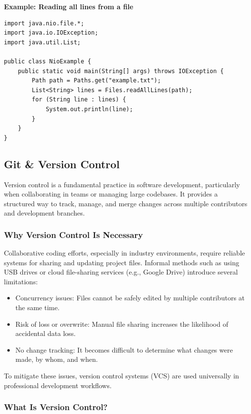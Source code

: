 \documentclass{article}
\begin{document}
\noindent\textbf{Example: Reading all lines from a file}
\begin{verbatim}
import java.nio.file.*;
import java.io.IOException;
import java.util.List;

public class NioExample {
    public static void main(String[] args) throws IOException {
        Path path = Paths.get("example.txt");
        List<String> lines = Files.readAllLines(path);
        for (String line : lines) {
            System.out.println(line);
        }
    }
}
\end{verbatim}

\subsection{Git \& Version Control}

Version control is a fundamental practice in software development, particularly when collaborating in teams or managing large codebases. It provides a structured way to track, manage, and merge changes across multiple contributors and development branches.

\subsubsection{Why Version Control Is Necessary}

Collaborative coding efforts, especially in industry environments, require reliable systems for sharing and updating project files. Informal methods such as using USB drives or cloud file-sharing services (e.g., Google Drive) introduce several limitations:

\begin{itemize}
    \item Concurrency issues: Files cannot be safely edited by multiple contributors at the same time.
    \item Risk of loss or overwrite: Manual file sharing increases the likelihood of accidental data loss.
    \item No change tracking: It becomes difficult to determine what changes were made, by whom, and when.
\end{itemize}

To mitigate these issues, version control systems (VCS) are used universally in professional development workflows.

\subsubsection{What Is Version Control?}
\end{document}

